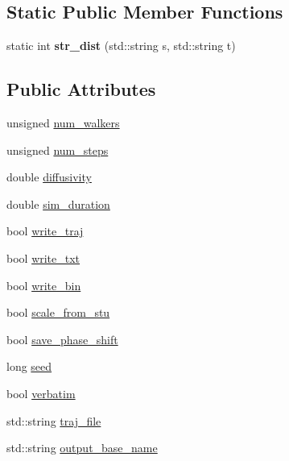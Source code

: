 \subsection*{Static Public Member Functions}
\begin{DoxyCompactItemize}
\item 
\mbox{\label{class_parameters_a150b4fdab4890be21905186d4c8422f2}} 
static int {\bfseries str\+\_\+dist} (std\+::string s, std\+::string t)
\end{DoxyCompactItemize}
\subsection*{Public Attributes}
\begin{DoxyCompactItemize}
\item 
unsigned \hyperlink{class_parameters_a35329cc60a28986ee4020457d46921fb}{num\+\_\+walkers}
\item 
unsigned \hyperlink{class_parameters_a3475e7efae778bc7720fe6c17274eef0}{num\+\_\+steps}
\item 
double \hyperlink{class_parameters_add48efa1d9fe056fdb21fe2d2d92533d}{diffusivity}
\item 
double \hyperlink{class_parameters_acbe36f055786ddcf8480a49d2c34c914}{sim\+\_\+duration}
\item 
bool \hyperlink{class_parameters_ac9408092b6254b4ccfecc85decbb1944}{write\+\_\+traj}
\item 
bool \hyperlink{class_parameters_a15446bf0727ebfe03f119821c7d8ed0f}{write\+\_\+txt}
\item 
bool \hyperlink{class_parameters_a4c98120687d1ba332d0c6cd5a14c59fb}{write\+\_\+bin}
\item 
bool \hyperlink{class_parameters_a3c37f738b7700bdc22845bc725d51e6f}{scale\+\_\+from\+\_\+stu}
\item 
bool \hyperlink{class_parameters_ab737ef40d88faa6ee8a701013d9d2984}{save\+\_\+phase\+\_\+shift}
\item 
long \hyperlink{class_parameters_afa076397ed9cbdc4c88215e29b850e3c}{seed}
\item 
bool \hyperlink{class_parameters_aabce43eb8376a94a8e765da99b58d003}{verbatim}
\item 
std\+::string \hyperlink{class_parameters_a75346dc3b7a41548a2f9e0560343df24}{traj\+\_\+file}
\item 
std\+::string \hyperlink{class_parameters_a2662ccc98a7a2b9f0c81f223a8f0748f}{output\+\_\+base\+\_\+name}

\end{DoxyCompactItemize}
